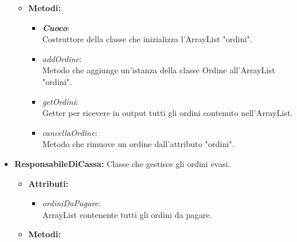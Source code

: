 \documentclass{article}
\begin{document}
\begin{itemize}
\begin{itemize}
                \item \textbf{Metodi:}
            
            \begin{itemize}
                \item \textbf{\textit{Cuoco}}: \\ Costruttore della classe che inizializza l'ArrayList "ordini".\\
                \item \textit{addOrdine}: \\Metodo che aggiunge un'istanza della classe Ordine all'ArrayList "ordini". \\
                \item \textit{getOrdini}: \\Getter per ricevere in output tutti gli ordini contenuto nell'ArrayList.\\
                \item \textit{cancellaOrdine}: \\Metodo che rimuove un ordine dall'attributo "ordini".\\
             
            \end{itemize}
            
        \end{itemize}
        
        \item \textbf{ResponsabileDiCassa:} Classe che gestisce gli ordini evasi.
        
        \begin{itemize}
            \item \textbf{Attributi:}
            
                \begin{itemize}
                    \item \textit{ordiniDaPagare}: \\ ArrayList contenente tutti gli ordini da pagare.\\
                \end{itemize}
                
                \item \textbf{Metodi:}
            

\end{itemize}
\end{itemize}
\end{document}
